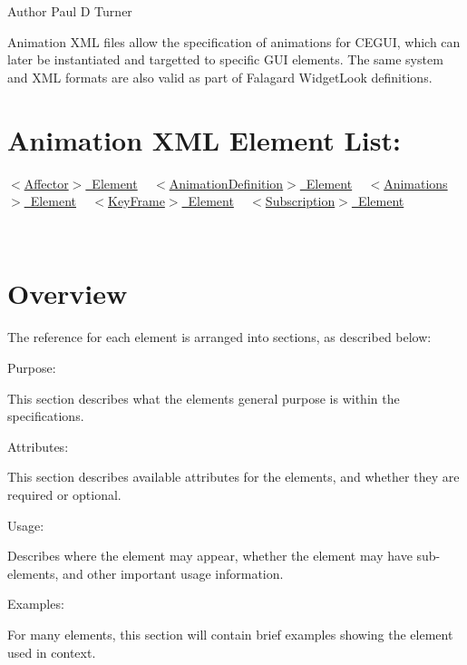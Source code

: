 \begin{DoxyAuthor}{Author}
Paul D Turner
\end{DoxyAuthor}
Animation X\+ML files allow the specification of animations for C\+E\+G\+UI, which can later be instantiated and targetted to specific G\+UI elements. The same system and X\+ML formats are also valid as part of Falagard Widget\+Look definitions.\hypertarget{xml_animation_xml_animation_contents}{}\section{Animation X\+M\+L Element List\+:}\label{xml_animation_xml_animation_contents}
\mbox{\hyperlink{xml_animation_xml_animation_affector}{$<$\+Affector$>$ Element}} ~\newline
 \mbox{\hyperlink{xml_animation_xml_animation_animationdefinition}{$<$\+Animation\+Definition$>$ Element}} ~\newline
 \mbox{\hyperlink{xml_animation_xml_animation_animations}{$<$\+Animations$>$ Element}} ~\newline
 \mbox{\hyperlink{xml_animation_xml_animation_keyframe}{$<$\+Key\+Frame$>$ Element}} ~\newline
 \mbox{\hyperlink{xml_animation_xml_animation_subscription}{$<$\+Subscription$>$ Element}} ~\newline


~\newline
 \hypertarget{xml_animation_xml_animation_overview}{}\section{Overview}\label{xml_animation_xml_animation_overview}
The reference for each element is arranged into sections, as described below\+:
\begin{DoxyItemize}
\item Purpose\+:
\begin{DoxyItemize}
\item This section describes what the elements general purpose is within the specifications.
\end{DoxyItemize}
\item Attributes\+:
\begin{DoxyItemize}
\item This section describes available attributes for the elements, and whether they are required or optional.
\end{DoxyItemize}
\item Usage\+:
\begin{DoxyItemize}
\item Describes where the element may appear, whether the element may have sub-\/elements, and other important usage information.
\end{DoxyItemize}
\item Examples\+:
\begin{DoxyItemize}
\item For many elements, this section will contain brief examples showing the element used in context.
\end{DoxyItemize}
\end{DoxyItemize}

